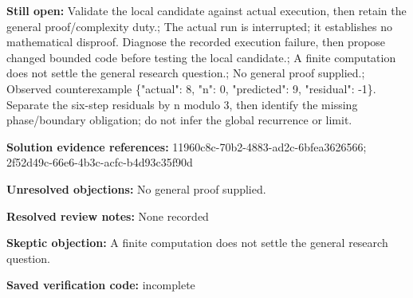 \documentclass[11pt]{article}
\begin{document}
\textbf{Still open:} Validate the local candidate against actual execution, then retain the general proof/complexity duty.; The actual run is interrupted; it establishes no mathematical disproof. Diagnose the recorded execution failure, then propose changed bounded code before testing the local candidate.; A finite computation does not settle the general research question.; No general proof supplied.; Observed counterexample \{"actual": 8, "n": 0, "predicted": 9, "residual": -1\}. Separate the six-step residuals by n modulo 3, then identify the missing phase/boundary obligation; do not infer the global recurrence or limit.\par
\textbf{Solution evidence references:} 11960c8c-70b2-4883-ad2c-6bfea3626566; 2f52d49c-66e6-4b3c-acfc-b4d93c35f90d\par
\textbf{Unresolved objections:} No general proof supplied.\par
\textbf{Resolved review notes:} None recorded\par
\textbf{Skeptic objection:} A finite computation does not settle the general research question.\par
\textbf{Saved verification code:} incomplete\par
\end{document}
